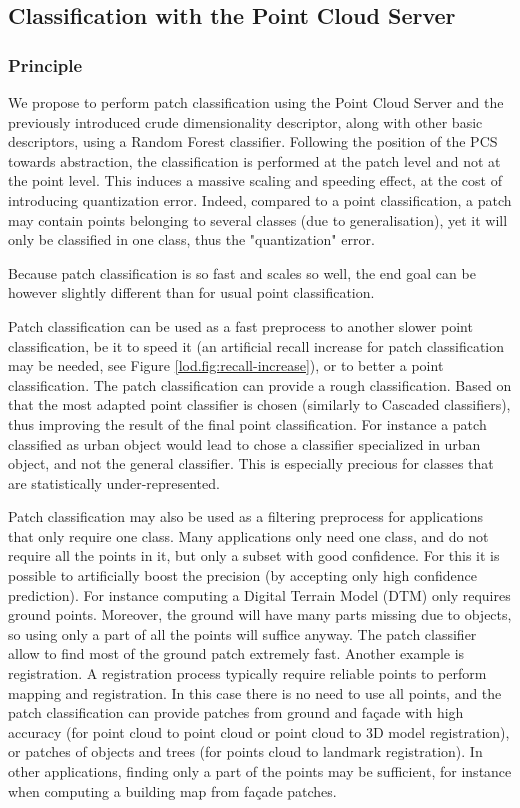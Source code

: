 		
	\subsection{Classification with the Point Cloud Server}
		\label{lod.method.classif}
		\subsubsection{Principle}
		
		We propose to perform patch classification using the Point Cloud Server and the previously introduced crude dimensionality descriptor, along with other basic descriptors, using a Random Forest classifier.
		Following the position of the PCS towards abstraction, the classification is performed at the patch level and not at the point level. 
		This induces a massive scaling and speeding effect, at the cost of introducing quantization error.
		Indeed, compared to a point classification, a patch may contain points belonging to several classes (due to generalisation), yet it will only be classified in one class, thus the "quantization" error.
		
		Because patch classification is so fast and scales so well,
		the end goal can be however slightly different than for usual point classification.
		
		
		Patch classification can be used as a fast preprocess to another slower point classification,
		be it to speed it (an artificial recall increase for patch classification may be needed, see Figure \ref{lod.fig:recall-increase}), or to better a point classification.
		The patch classification can provide a rough classification.
		Based on that the most adapted point classifier is chosen 
		(similarly to Cascaded classifiers),
		thus improving the result of the final point classification.
		For instance a patch classified as urban object would lead to chose a classifier specialized in urban object, and not the general classifier.
		This is especially precious for classes that are statistically under-represented.
		 
		Patch classification may also be used as a filtering preprocess for applications that only require one class. 
		Many applications only need one class, and do not require all the points in it, but only a subset with good confidence.
		For this it is possible to artificially boost the precision (by accepting only high confidence prediction).
		For instance computing a Digital Terrain Model (DTM) only requires ground points.
		Moreover, the ground will have many parts missing due to objects,
		so using only a part of all the points will suffice anyway. 
		The patch classifier allow to find most of the ground patch extremely fast.
		Another example is registration.
		A registration process typically require reliable points to perform mapping and registration.
		In this case there is no need to use all points,
		and the patch classification can provide patches from ground and façade with high accuracy
		(for point cloud to point cloud or point cloud to 3D model registration),
		or patches of objects and trees (for points cloud to landmark registration).
		In other applications, finding only a part of the points may be sufficient, for instance when computing a building map from façade patches.
		
